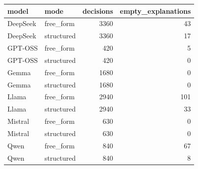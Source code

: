\begin{tabular}{llrr}
\toprule
model & mode & decisions & empty\_explanations \\
\midrule
DeepSeek & free\_form & 3360 & 43 \\
DeepSeek & structured & 3360 & 17 \\
GPT-OSS & free\_form & 420 & 5 \\
GPT-OSS & structured & 420 & 0 \\
Gemma & free\_form & 1680 & 0 \\
Gemma & structured & 1680 & 0 \\
Llama & free\_form & 2940 & 101 \\
Llama & structured & 2940 & 33 \\
Mistral & free\_form & 630 & 0 \\
Mistral & structured & 630 & 0 \\
Qwen & free\_form & 840 & 67 \\
Qwen & structured & 840 & 8 \\
\bottomrule
\end{tabular}
